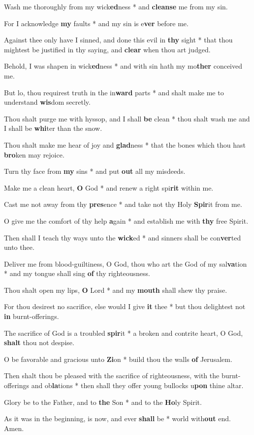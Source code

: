 \begin{multicols}{2}
	Wash me thoroughly from my wick\textbf{ed}ness * and \textbf{cleanse} me from my sin.
	
	For I acknowledge \textbf{my} faults * and my sin is e\textbf{ver} before me.
	
	Against thee only have I sinned, and done this evil in \textbf{thy} sight * that thou mightest be justified in thy saying, and \textbf{clear} when thou art judged.
	
	Behold, I was shapen in wick\textbf{ed}ness * and with sin hath my mo\textbf{ther} conceived me.
	
	But lo, thou requirest truth in the in\textbf{ward} parts * and shalt make me to understand \textbf{wis}dom secretly.
	
	Thou shalt purge me with hyssop, and I shall \textbf{be} clean * thou shalt wash me and I shall be \textbf{whi}ter than the snow.
	
	Thou shalt make me hear of joy and \textbf{glad}ness * that the bones which thou hast \textbf{bro}ken may rejoice.
	
	Turn thy face from \textbf{my} sins * and put \textbf{out} all my misdeeds.
	
	Make me a clean heart, \textbf{O} God * and renew a right spi\textbf{rit} within me.
	
	Cast me not away from thy \textbf{pres}ence * and take not thy Holy \textbf{Spir}it from me.
	
	O give me the comfort of thy help \textbf{a}gain * and establish me with \textbf{thy} free Spirit.
	
	Then shall I teach thy ways unto the \textbf{wick}ed * and sinners shall be con\textbf{ver}ted unto thee.
	
	Deliver me from blood-guiltiness, O God, thou who art the God of my sal\textbf{va}tion * and my tongue shall sing \textbf{of} thy righteousness.
	
	Thou shalt open my lips, \textbf{O} Lord * and my \textbf{mouth} shall shew thy praise.
	
	For thou desirest no sacrifice, else would I give \textbf{it} thee * but thou delightest not \textbf{in} burnt-offerings.
	
	The sacrifice of God is a troubled \textbf{spir}it * a broken and contrite heart, O God, \textbf{shalt} thou not despise.
	
	O be favorable and gracious unto \textbf{Zi}on * build thou the walls \textbf{of} Jerusalem.
	
	Then shalt thou be pleased with the sacrifice of righteousness, with the burnt-offerings and ob\textbf{la}tions * then shall they offer young bullocks u\textbf{pon} thine altar.
	
	Glory be to the Father, and to \textbf{the} Son * and to the \textbf{Ho}ly Spirit.
	
	As it was in the beginning, is now, and ever \textbf{shall} be * world with\textbf{out} end. Amen.
\end{multicols}